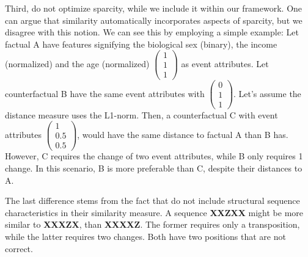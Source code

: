 \documentclass[./../../paper.tex]{subfiles}
\begin{document}
Third, \autocite{hsieh_DiCE4ELInterpretingProcess_2021} do not optimize sparcity, while we include it within our framework. One can argue that similarity automatically incorporates aspects of sparcity, but we disagree with this notion. We can see this by employing a simple example:  Let factual A have features signifying the biological sex (binary), the income (normalized) and the age (normalized) $\begin{pmatrix}1\\1\\1\end{pmatrix}$ as event attributes. Let counterfactual B have the same event attributes with $\begin{pmatrix}0\\1\\1\end{pmatrix}$. Let's assume the distance measure uses the L1-norm. Then, a counterfactual C with event attributes $\begin{pmatrix}1\\0.5\\0.5\end{pmatrix}$, would have the same distance to factual A than B has. However, C requires the change of two event attributes, while B only requires 1 change. In this scenario, B is more preferable than C, despite their distances to A.

The last difference stems from the fact that \citeauthor{hsieh_DiCE4ELInterpretingProcess_2021} do not include structural sequence characteristics in their similarity measure. A sequence \textbf{XXZXX} might be more similar to \textbf{XXXZX}, than \textbf{XXXXZ}. The former requires only a transposition, while the latter requires two changes. Both have two positions that are not correct.  
\end{document}
